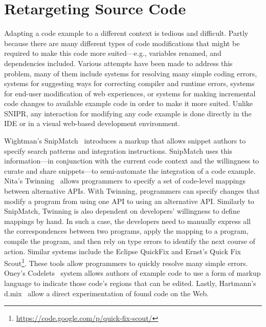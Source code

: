 \section{Retargeting Source Code}
\label{sec:retargetingcode}

Adapting a code example to a different context is tedious and difficult. Partly because there are many different types of code modifications that might be required to make this code more suited---e.g., variables renamed, and dependencies included. Various attempts have been made to address this problem, many of them include systems for resolving many simple coding errors, systems for suggesting ways for correcting compiler and runtime errors, systems for end-user modification of web experiences, or systems for making incremental code changes to available example code in order to make it more suited. Unlike \uppercase{SnipR}, any interaction for modifying any code example is done directly in the IDE or in a visual web-based development environment.  

Wightman's SnipMatch~\cite{Wightman:2012gc} introduces a markup that allows snippet authors to specify search patterns and integration instructions. SnipMatch uses this information---in conjunction with the current code context and the willingness to curate and share snippets---to semi-automate the integration of a code example. Nita's Twinning~\cite{Nita:2010en} allows programmers to specify a set of code-level mappings between alternative APIs. With Twinning, programmers can specify changes that modify a program from using one API to using an alternative API. Similarly to SnipMatch, Twinning is also dependent on developers' willingness to define mappings by hand. In such a case, the developers need to manually express all the correspondences between two programs, apply the mapping to a program, compile the program, and then rely on type errors to identify the next course of action.  Similar systems include the Eclipse QuickFix and Ernst's Quick Fix Scout\footnote{\url{https://code.google.com/p/quick-fix-scout/}}. These tools allow programmers to quickly resolve many simple errors. Oney's Codelets~\cite{Oney:2012ge} system allows authors of example code to use a form of markup language to indicate those code's regions that can be edited. Lastly, Hartmann's d.mix~\cite{Hartmann:2007wf} allow a direct experimentation of found code on the Web.


